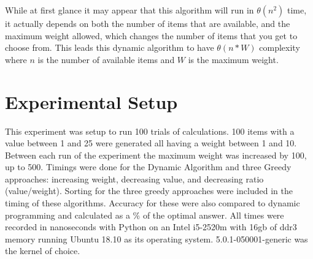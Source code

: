 \documentclass[10pt, letterpaper]{article}
\begin{document}
\medskip
While at first glance it may appear that this algorithm will run in $\theta(n^2)$ time, it actually depends on both the number of items that are available, and the maximum weight allowed, which changes the number of items that you get to choose from. This leads this dynamic algorithm to have $\theta(n * W)$ complexity where $n$ is the number of available items and $W$ is the maximum weight.

\section{Experimental Setup}
This experiment was setup to run 100 trials of calculations. 100 items with a value between 1 and 25 were generated all having a weight between 1 and 10. Between each run of the experiment the maximum weight was increased by 100, up to 500. Timings were done for the Dynamic Algorithm and three Greedy approaches: increasing weight, decreasing value, and decreasing ratio (value/weight). Sorting for the three greedy approaches were included in the timing of these algorithms. Accuracy for these were also compared to dynamic programming and calculated as a \% of the optimal answer. All times were recorded in nanoseconds with Python on an Intel i5-2520m with 16gb of ddr3 memory running Ubuntu 18.10 as its operating system. 5.0.1-050001-generic was the kernel of choice.
\end{document}
